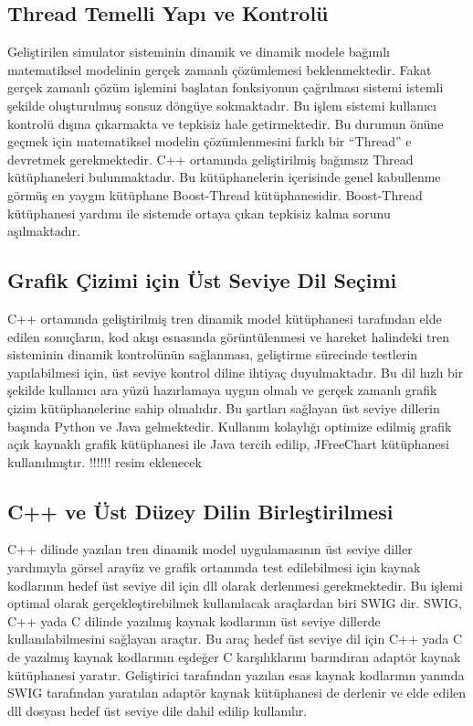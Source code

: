 \documentclass[10pt,a4paper]{article}
\begin{document}
\subsection{Thread Temelli Yapı ve Kontrolü}
Geliştirilen simulator sisteminin dinamik ve dinamik modele bağımlı matematiksel modelinin gerçek zamanlı çözümlemesi beklenmektedir. Fakat gerçek  zamanlı çözüm işlemini başlatan fonksiyonun çağrılması sistemi istemli şekilde oluşturulmuş sonsuz döngüye sokmaktadır. Bu işlem sistemi kullanıcı kontrolü dışına çıkarmakta ve tepkisiz hale getirmektedir. Bu durumun önüne geçmek için matematiksel modelin çözümlenmesini farklı bir  “Thread” e devretmek gerekmektedir. 
C++ ortamında geliştirilmiş bağımsız Thread kütüphaneleri bulunmaktadır. Bu kütüphanelerin içerisinde genel kabullenme görmüş en yaygın kütüphane Boost-Thread kütüphanesidir. Boost-Thread kütüphanesi yardımı ile sistemde ortaya çıkan tepkisiz kalma sorunu aşılmaktadır.

\subsection{Grafik Çizimi için Üst Seviye Dil Seçimi}
C++ ortamında geliştirilmiş tren dinamik model kütüphanesi tarafından elde edilen sonuçların, kod akışı esnasında görüntülenmesi ve hareket halindeki tren sisteminin dinamik kontrolünün sağlanması, geliştirme sürecinde testlerin yapılabilmesi için, üst seviye kontrol diline ihtiyaç duyulmaktadır. Bu dil hızlı bir şekilde kullanıcı ara yüzü hazırlamaya uygun olmalı ve gerçek zamanlı grafik çizim kütüphanelerine sahip olmalıdır. Bu şartları sağlayan üst seviye dillerin başında Python ve Java gelmektedir. 
Kullanım kolaylığı optimize edilmiş grafik  açık kaynaklı grafik kütüphanesi ile Java tercih edilip, JFreeChart kütüphanesi kullanılmıştır. !!!!!! resim eklenecek

\subsection{C++ ve Üst Düzey Dilin Birleştirilmesi}
C++ dilinde yazılan tren dinamik model uygulamasının üst seviye diller yardımıyla görsel arayüz ve grafik ortamında test edilebilmesi için kaynak kodlarının hedef üst seviye dil için dll olarak derlenmesi gerekmektedir. Bu işlemi optimal olarak gerçekleştirebilmek kullanılacak araçlardan biri SWIG dir. 
SWIG, C++ yada C dilinde yazılmış kaynak kodlarının üst seviye dillerde kullanılabilmesini sağlayan araçtır. Bu araç hedef  üst seviye dil için C++ yada C de yazılmış kaynak kodlarının eşdeğer C karşılıklarını barındıran adaptör kaynak kütüphanesi yaratır. Geliştirici tarafından yazılan esas kaynak kodlarının yanında SWIG tarafından yaratılan adaptör kaynak kütüphanesi de derlenir ve elde edilen dll dosyası hedef üst seviye dile dahil edilip kullanılır.
\end{document}
